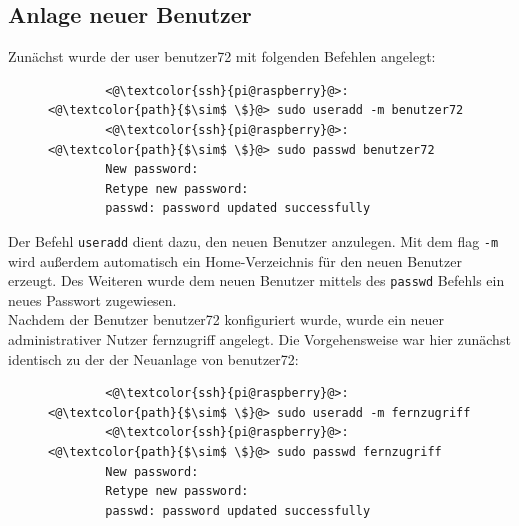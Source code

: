 \documentclass[a4paper, 12pt]{scrartcl}
\begin{document}
\subsection{Anlage neuer Benutzer}\label{ch:user_add}
Zunächst wurde der user \glqq benutzer72\grqq{} mit folgenden Befehlen angelegt:
\begin{figure}[H]
    \begin{mdframed}[backgroundcolor=bbg]
        \begin{lstlisting}
        <@\textcolor{ssh}{pi@raspberry}@>:<@\textcolor{path}{$\sim$ \$}@> sudo useradd -m benutzer72
        <@\textcolor{ssh}{pi@raspberry}@>:<@\textcolor{path}{$\sim$ \$}@> sudo passwd benutzer72
        New password:
        Retype new password:
        passwd: password updated successfully
        \end{lstlisting}
    \end{mdframed}
    \label{lst:user_72}
\end{figure}
Der Befehl \lstinline[basicstyle={\small\ttfamily\color{black}}]|useradd| dient dazu, den neuen Benutzer anzulegen. Mit dem flag \lstinline[basicstyle={\small\ttfamily\color{black}}]|-m| wird außerdem
automatisch ein Home-Verzeichnis für den neuen Benutzer erzeugt. Des Weiteren wurde dem neuen Benutzer mittels des \lstinline[basicstyle={\small\ttfamily\color{black}}]|passwd| Befehls ein neues Passwort
zugewiesen.
\\
Nachdem der Benutzer benutzer72 konfiguriert wurde, wurde ein neuer administrativer Nutzer \glqq fernzugriff\grqq{} angelegt. Die Vorgehensweise war hier zunächst identisch zu der der Neuanlage von
benutzer72:
\begin{figure}[H]
    \begin{mdframed}[backgroundcolor=bbg]
        \begin{lstlisting}
        <@\textcolor{ssh}{pi@raspberry}@>:<@\textcolor{path}{$\sim$ \$}@> sudo useradd -m fernzugriff
        <@\textcolor{ssh}{pi@raspberry}@>:<@\textcolor{path}{$\sim$ \$}@> sudo passwd fernzugriff
        New password:
        Retype new password:
        passwd: password updated successfully
        \end{lstlisting}
    \end{mdframed}
    \label{lst:user_fernzugriff}
\end{figure}
\end{document}
